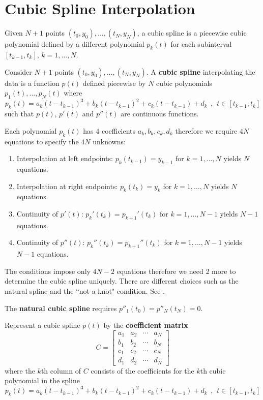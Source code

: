 \section{Cubic Spline Interpolation}

\begin{bigidea}
Given $N+1$ points $(t_0,y_0),\dots,(t_N,y_N)$, a cubic spline is a piecewise cubic polynomial defined by a different polynomial $p_k(t)$ for each subinterval $[t_{k-1},t_k]$, $k=1,\dots,N$.
\end{bigidea}

\begin{definition}
Consider $N+1$ points $(t_0,y_0),\dots,(t_N,y_N)$. A {\bf cubic spline} \cite[p.326]{MH} interpolating the data is a function $p(t)$ defined piecewise by $N$ cubic polynomials $p_1(t),\dots,p_N(t)$ where
$$
p_k(t) = a_k(t - t_{k-1})^3 + b_k(t - t_{k-1})^2 + c_k(t - t_{k-1}) + d_k \ \ , \ \ t \in [t_{k-1},t_k]
$$
such that $p(t)$, $p'(t)$ and $p''(t)$ are continuous functions.
\end{definition}

\begin{note}
Each polynomial $p_k(t)$ has 4 coefficients $a_k,b_k,c_k,d_k$ therefore we require $4N$ equations to specify the $4N$ unknowns:
\begin{enumerate}
\item Interpolation at left endpoints: $p_k(t_{k-1}) = y_{k-1}$ for $k=1,\dots,N$ yields $N$ equations.
\item Interpolation at right endpoints: $p_k(t_k) = y_k$ for $k=1,\dots,N$ yields $N$ equations.
\item Continuity of $p'(t)$: $p_k'(t_k) = p_{k+1}'(t_k)$ for $k=1,\dots,N-1$ yields $N-1$ equations.
\item Continuity of $p''(t)$: $p_k''(t_k) = p_{k+1}''(t_k)$ for $k=1,\dots,N-1$ yields $N-1$ equations.
\end{enumerate}
The conditions impose only $4N-2$ equations therefore we need 2 more to determine the cubic spline uniquely. There are different choices such as the natural spline and the ``not-a-knot" condition. See \cite[p.327]{MH}.
\end{note}

\begin{definition}
The {\bf natural cubic spline} \cite[p.327]{MH} requires $p''_1(t_0) = p''_N(t_N) = 0$.
\end{definition}

\begin{definition}
Represent a cubic spline $p(t)$ by the {\bf coefficient matrix}
$$
C=
\begin{bmatrix}
a_1 & a_2 & \cdots & a_N \\
b_1 & b_2 & \cdots & b_N \\
c_1 & c_2 & \cdots & c_N \\
d_1 & d_2 & \cdots & d_N
\end{bmatrix}
$$
where the $k$th column of $C$ consists of the coefficients for the $k$th cubic polynomial in the spline
$$
p_k(t) = a_k(t - t_{k-1})^3 + b_k(t - t_{k-1})^2 + c_k(t - t_{k-1}) + d_k \ \ , \ \ t \in [t_{k-1},t_k]
$$
\end{definition}

